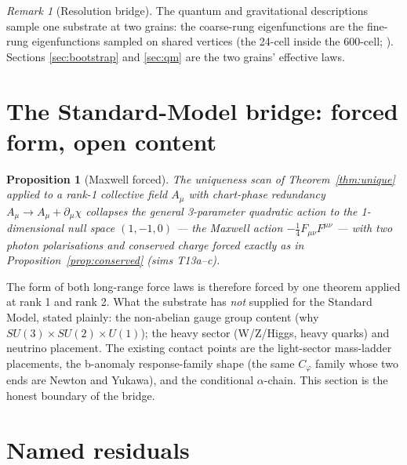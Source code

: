 \documentclass[12pt]{article}
\newtheorem{proposition}[theorem]{Proposition}
\theoremstyle{definition}
\theoremstyle{remark}
\newtheorem{remark}[theorem]{Remark}
\begin{document}
\begin{remark}[Resolution bridge]
The quantum and gravitational descriptions sample one substrate at two grains: the coarse-rung eigenfunctions are the fine-rung eigenfunctions sampled on shared vertices (the 24-cell inside the 600-cell; \citealp{SmartXL}). Sections \ref{sec:bootstrap} and \ref{sec:qm} are the two grains' effective laws.
\end{remark}

\section{The Standard-Model bridge: forced form, open content}\label{sec:sm}

\begin{proposition}[Maxwell forced]\label{prop:maxwell}
The uniqueness scan of Theorem~\ref{thm:unique} applied to a rank-1 collective field $A_\mu$ with chart-phase redundancy $A_\mu \to A_\mu + \partial_\mu\chi$ collapses the general 3-parameter quadratic action to the 1-dimensional null space $(1, -1, 0)$ --- the Maxwell action $-\tfrac14 F_{\mu\nu}F^{\mu\nu}$ --- with two photon polarisations and conserved charge forced exactly as in Proposition~\ref{prop:conserved} (sims T13a--c).
\end{proposition}

The form of both long-range force laws is therefore forced by one theorem applied at rank 1 and rank 2. What the substrate has \emph{not} supplied for the Standard Model, stated plainly: the non-abelian gauge group content (why $SU(3)\times SU(2)\times U(1)$); the heavy sector (W/Z/Higgs, heavy quarks) and neutrino placement. The existing contact points are the light-sector mass-ladder placements, the b-anomaly response-family shape (the same $C_\varphi$ family whose two ends are Newton and Yukawa), and the conditional $\alpha$-chain. This section is the honest boundary of the bridge.

\section{Named residuals}\label{sec:residuals}
\end{document}
